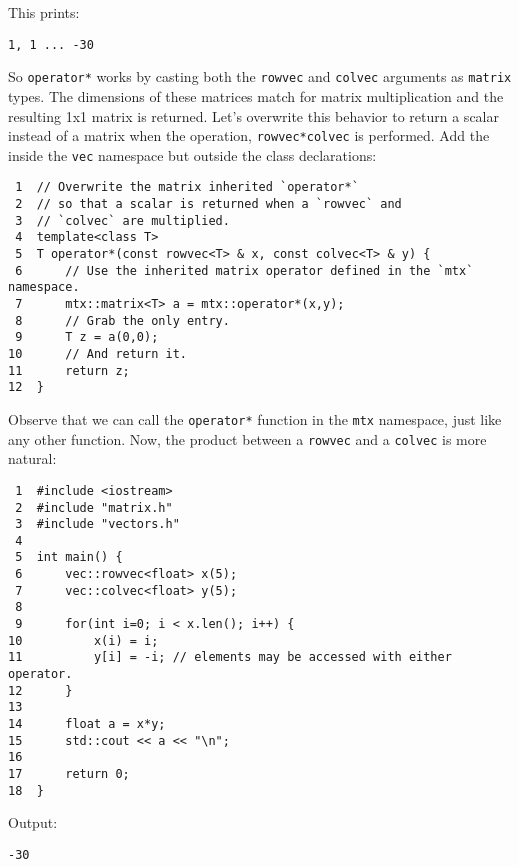 \documentclass[11pt]{article}
\begin{document}
This prints:

\begin{verbatim}
1, 1 ... -30
\end{verbatim}

So \texttt{operator*} works by casting both the \texttt{rowvec} and \texttt{colvec} arguments 
as \texttt{matrix} types. The dimensions of these matrices match for matrix 
multiplication and the resulting 1x1 matrix is returned. Let's overwrite
this behavior to return a scalar instead of a matrix when the operation,
\texttt{rowvec*colvec} is performed. Add the inside the \texttt{vec} namespace but outside 
the class declarations:

\begin{verbatim}
 1  // Overwrite the matrix inherited `operator*`
 2  // so that a scalar is returned when a `rowvec` and
 3  // `colvec` are multiplied.
 4  template<class T>
 5  T operator*(const rowvec<T> & x, const colvec<T> & y) {
 6      // Use the inherited matrix operator defined in the `mtx` namespace.
 7      mtx::matrix<T> a = mtx::operator*(x,y);
 8      // Grab the only entry.
 9      T z = a(0,0);
10      // And return it.
11      return z;
12  }
\end{verbatim}

Observe that we can call the \texttt{operator*} function in the \texttt{mtx} namespace,
just like any other function. Now, the product between a \texttt{rowvec} and a \texttt{colvec}
is more natural:

\begin{verbatim}
 1  #include <iostream>
 2  #include "matrix.h"
 3  #include "vectors.h"
 4  
 5  int main() {
 6      vec::rowvec<float> x(5);
 7      vec::colvec<float> y(5);
 8  
 9      for(int i=0; i < x.len(); i++) {
10          x(i) = i;
11          y[i] = -i; // elements may be accessed with either operator.
12      }
13  
14      float a = x*y;
15      std::cout << a << "\n";
16  
17      return 0;
18  }
\end{verbatim}

Output:

\begin{verbatim}
-30
\end{verbatim}
\end{document}
